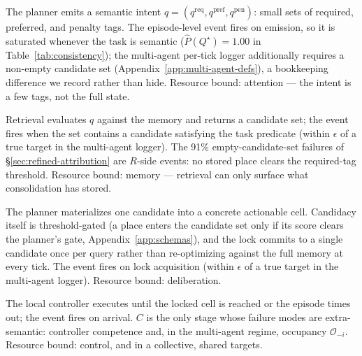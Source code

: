 \documentclass{article}
\begin{document}
\begin{description}[leftmargin=10pt,topsep=2pt,itemsep=2pt]
\item[$Q^\star$ (intent issued).] The planner emits a semantic intent $q=(q^{\mathrm{req}},q^{\mathrm{pref}},q^{\mathrm{pen}})$: small sets of required, preferred, and penalty tags. The episode-level event fires on emission, so it is saturated whenever the task is semantic ($\hat P(Q^\star){=}1.00$ in Table~\ref{tab:consistency}); the multi-agent per-tick logger additionally requires a non-empty candidate set (Appendix~\ref{app:multi-agent-defs}), a bookkeeping difference we record rather than hide. Resource bound: attention --- the intent is a few tags, not the full state.
\item[$R^\star$ (memory answers).] Retrieval evaluates $q$ against the memory and returns a candidate set; the event fires when the set contains a candidate satisfying the task predicate (within $\epsilon$ of a true target in the multi-agent logger). The 91\% empty-candidate-set failures of \S\ref{sec:refined-attribution} are $R$-side events: no stored place clears the required-tag threshold. Resource bound: memory --- retrieval can only surface what consolidation has stored.
\item[$M^\star$ (target lock).] The planner materializes one candidate into a concrete actionable cell. Candidacy itself is threshold-gated (a place enters the candidate set only if its score clears the planner's gate, Appendix~\ref{app:schemas}), and the lock commits to a single candidate once per query rather than re-optimizing against the full memory at every tick. The event fires on lock acquisition (within $\epsilon$ of a true target in the multi-agent logger). Resource bound: deliberation.
\item[$C^\star$ (closed-loop completion).] The local controller executes until the locked cell is reached or the episode times out; the event fires on arrival. $C$ is the only stage whose failure modes are extra-semantic: controller competence and, in the multi-agent regime, occupancy $\mathcal{O}_{-i}$. Resource bound: control, and in a collective, shared targets.
\end{description}
\end{document}
